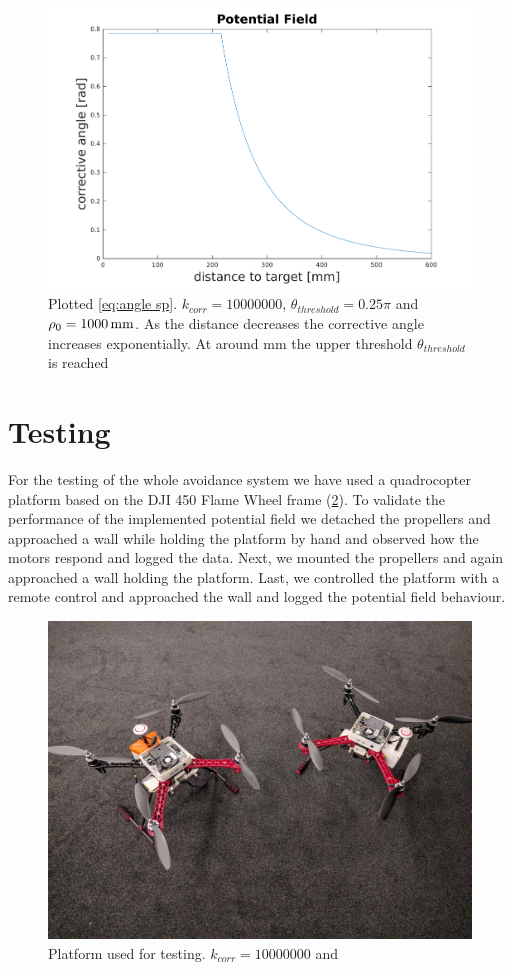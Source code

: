 \begin{figure}
	\centering
	\includegraphics[width=0.8\linewidth]{pictures/plot_pf_matlab.pdf}
	\caption{Plotted \cref{eq:angle sp}. $k_{corr}=10000000$, $\theta_{threshold}=0.25\pi$ and $\rho_0=\unit[1000]{mm}$. As the distance decreases the corrective angle increases exponentially. At around \unit[200]{mm} the upper threshold $\theta_{threshold}$ is reached}
	\label{fig:pf matlab}
\end{figure}


\section{Testing}
\label{sec:testing}
For the testing of the whole avoidance system we have used a quadrocopter platform based on the DJI 450 Flame Wheel frame (\cref{fig:loon}). To validate the performance of the implemented potential field we detached the propellers and approached a wall while holding the platform by hand and observed how the motors respond and logged the data. Next, we mounted the propellers and again approached a wall holding the platform. Last, we controlled the platform with a remote control and approached the wall and logged the potential field behaviour.  
\begin{figure}
	\centering
	\includegraphics[width=0.8\linewidth]{pictures/loons.jpg}
	\caption{Platform used for testing. $k_{corr}=10000000$ and}
	\label{fig:loon}
\end{figure}